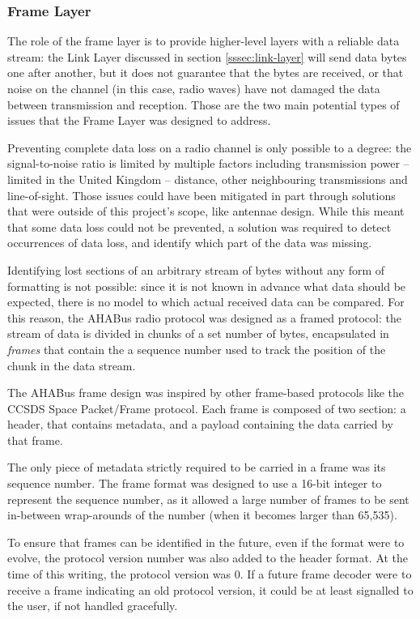 \subsubsection{Frame Layer}
\label{sssec:frame-layer}

The role of the frame layer is to provide higher-level layers with a reliable
data stream: the Link Layer discussed in section \ref{sssec:link-layer} will
send data bytes one after another, but it does not guarantee that the bytes are
received, or that noise on the channel (in this case, radio waves) have not
damaged the data between transmission and reception. Those are the two main
potential types of issues that the Frame Layer was designed to address.

Preventing complete data loss on a radio channel is only possible to a degree:
the signal-to-noise ratio is limited by multiple factors including transmission
power – limited in the United Kingdom – distance, other neighbouring
transmissions and line-of-sight. Those issues could have been mitigated in part
through solutions that were outside of this project's scope, like antennae
design. While this meant that some data loss could not be prevented, a solution
was required to detect occurrences of data loss, and identify which part of the
data was missing.

Identifying lost sections of an arbitrary stream of bytes without any form of
formatting is not possible: since it is not known in advance what data should
be expected, there is no model to which actual received data can be compared.
For this reason, the AHABus radio protocol was designed as a framed protocol:
the stream of data is divided in chunks of a set number of bytes, encapsulated
in \textit{frames} that contain the a sequence number used to track the position
of the chunk in the data stream.

The AHABus frame design was inspired by other frame-based protocols like the
CCSDS Space Packet/Frame protocol. Each frame is composed of two section: a
header, that contains metadata, and a payload containing the data carried by
that frame.

The only piece of metadata strictly required to be carried in a frame was its
sequence number. The frame format was designed to use a 16-bit integer to
represent the sequence number, as it allowed a large number of frames to be
sent in-between wrap-arounds of the number (when it becomes larger than 65,535).

To ensure that frames can be identified in the future, even if the format were
to evolve, the protocol version number was also added to the header format. At
the time of this writing, the protocol version was 0. If a future frame decoder
were to receive a frame indicating an old protocol version, it could be at
least signalled to the user, if not handled gracefully.

